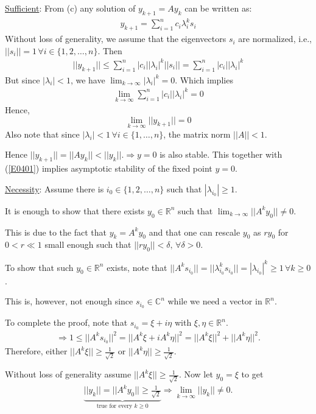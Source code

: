 \begin{solution}[3.1]
\begin{enumerate}
\underline{Sufficient}: From (c) any solution of $y_{k+1} = Ay_k$ can be written as:
\begin{align}
	y_{k+1} = \sum_{i=1}^n c_i \lambda_i^k s_i
\end{align}
Without loss of generality, we assume that the eigenvectors $s_i$ are normalized, i.e., $||s_i|| = 1 \,\forall i\in\{1,2,\ldots,n\}$. Then
\begin{align}
	||y_{k+1}|| \leq \sum_{i=1}^n |c_i||\lambda_i|^k ||s_i|| = \sum_{i=1}^n |c_i||\lambda_i|^k
\end{align}
But since $|\lambda_i|<1$, we have $\displaystyle \lim_{k \rightarrow \infty} |\lambda_i|^k = 0$. Which implies
\begin{align}
	\lim_{k \rightarrow \infty} \sum_{i=1}^n |c_i||\lambda_i|^k = 0
\end{align}
Hence, 
\begin{equation}\label{E0401}
	\lim_{k \rightarrow \infty} ||y_{k+1}||=0
\end{equation}
Also note that since $|\lambda_i|<1 \,\forall i\in \{1,\ldots,n\}$, the matrix norm $||A||<1$.

Hence $||y_{k+1}|| = ||Ay_k|| < ||y_k||. \Longrightarrow y=0$ is also stable. This together with (\ref{E0401}) implies asymptotic stability of the fixed point $y=0$.

\underline{Necessity}: Assume there is $i_0\in\{1,2,\ldots, n\}$ such that $|\lambda_{i_0}| \geq 1$.

It is enough to show that there exists $y_0 {\in\mathbb{R}^n}$ such that $\lim_{k \rightarrow \infty} ||A^ky_0|| \neq 0$.

This is due to the fact that $y_k = A^ky_0$ and that one can rescale $y_0$ as $ry_0$ for $0<r \ll 1$ small enough such that $||ry_0||<\delta, \,\forall \delta > 0$.

To show that such $y_0 \in \mathbb{R}^n$ exists, note that $||A^ks_{i_0}|| = ||\lambda_{i_0}^ks_{i_0}|| = |\lambda_{i_0}|^k \geq 1 \,\forall k \geq 0$.
\begin{remark}[]
	This is, however, not enough since $s_{i_0}\in\mathbb{C}^n$ while we need a vector in $\mathbb{R}^n$.
\end{remark}

To complete the proof, note that $s_{i_0}=\xi + i\eta$ with $\xi, \eta \in \mathbb{R}^n$.
\begin{align}
	\Longrightarrow 1 \leq ||A^ks_{i_0}||^2 = ||A^k\xi + i A^k\eta ||^2 = ||A^k\xi||^2 + ||A^k\eta||^2.
\end{align}
Therefore, either $||A^k\xi|| \geq \frac{1}{\sqrt{2}}$ or $||A^k\eta|| \geq \frac{1}{\sqrt{2}}$.

Without loss of generality assume $||A^k\xi|| \geq \frac{1}{\sqrt{2}}$. Now let $y_0 = \xi$ to get
\begin{align}
	\underbrace{||y_k|| = ||A^ky_0|| \geq \frac{1}{\sqrt{2}}}_{\text{true for every }k\geq 0} \Longrightarrow \lim_{k \rightarrow \infty} ||y_k|| \neq 0.
\end{align}
\end{enumerate}
\end{solution}

